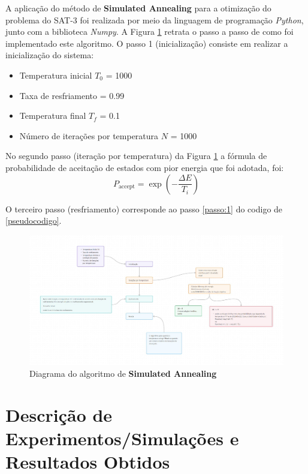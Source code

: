 \documentclass[12pt]{article}
\begin{document}
A aplicação do método de \textbf{Simulated Annealing} para a otimização do problema do SAT-3 foi realizada por meio da linguagem de programação \textit{Python}, junto com a biblioteca \textit{Numpy}.
%
A Figura \ref{fig:metodologia} retrata o passo a passo de como foi implementado este algoritmo.
%
O passo 1 (inicialização) consiste em realizar a inicialização do sistema:

\begin{itemize}
  \item Temperatura inicial $T_0$ = 1000
  \item Taxa de resfriamento \alpha = 0.99
  \item Temperatura final $T_f$ = 0.1
  \item Número de iterações por temperatura $N$ = 1000
\end{itemize}

No segundo passo (iteração por temperatura) da Figura \ref{fig:metodologia} a fórmula de probabilidade de aceitação de estados com pior energia que foi adotada, foi:
\begin{equation}
  P_{\text{accept}} = \exp\left(-\frac{\Delta E}{T_i}\right)
\end{equation}

O terceiro passo (resfriamento) corresponde ao passo \ref{passo:1} do codigo de \ref{pseudocodigo}.

\begin{figure}[H]
  \centering
  \includegraphics[width=1\textwidth]{pasta_.jpeg}
  \caption{Diagrama do algoritmo de \textbf{Simulated Annealing}}
  \label{fig:metodologia}
  \end{figure}

\section{Descrição de Experimentos/Simulações e Resultados Obtidos}
\label{sec:descicao_de_experimentos_/_simulacoes_e_resultados_obtidos}
\end{document}
